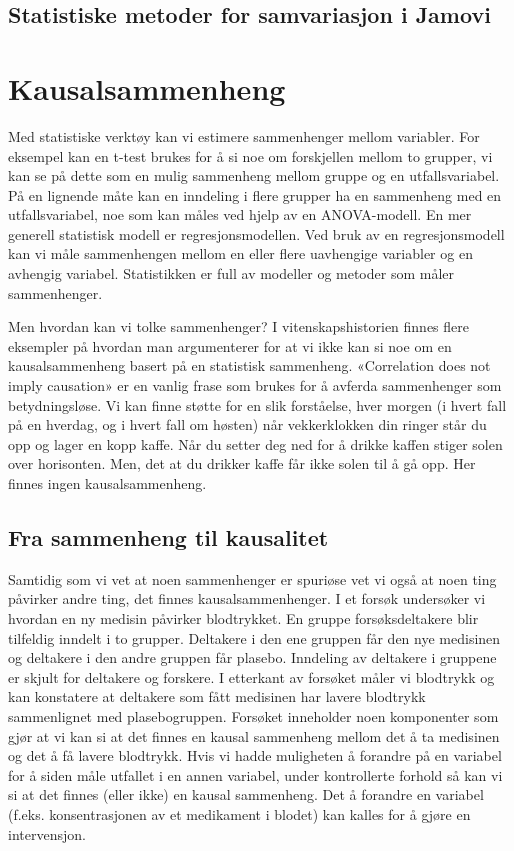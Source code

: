 \documentclass[
  letterpaper,
  DIV=11,
  numbers=noendperiod,
  oneside]{scrreprt}
\begin{document}
\hypertarget{statistiske-metoder-for-samvariasjon-i-jamovi}{%
\chapter{Statistiske metoder for samvariasjon i
Jamovi}\label{statistiske-metoder-for-samvariasjon-i-jamovi}}

\part{Kausalsammenheng}

Med statistiske verktøy kan vi estimere sammenhenger mellom variabler.
For eksempel kan en t-test brukes for å si noe om forskjellen mellom to
grupper, vi kan se på dette som en mulig sammenheng mellom gruppe og en
utfallsvariabel. På en lignende måte kan en inndeling i flere grupper ha
en sammenheng med en utfallsvariabel, noe som kan måles ved hjelp av en
ANOVA-modell. En mer generell statistisk modell er regresjonsmodellen.
Ved bruk av en regresjonsmodell kan vi måle sammenhengen mellom en eller
flere uavhengige variabler og en avhengig variabel. Statistikken er full
av modeller og metoder som måler sammenhenger.

Men hvordan kan vi tolke sammenhenger? I vitenskapshistorien finnes
flere eksempler på hvordan man argumenterer for at vi ikke kan si noe om
en kausalsammenheng basert på en statistisk sammenheng. «Correlation
does not imply causation» er en vanlig frase som brukes for å avferda
sammenhenger som betydningsløse. Vi kan finne støtte for en slik
forståelse, hver morgen (i hvert fall på en hverdag, og i hvert fall om
høsten) når vekkerklokken din ringer står du opp og lager en kopp kaffe.
Når du setter deg ned for å drikke kaffen stiger solen over horisonten.
Men, det at du drikker kaffe får ikke solen til å gå opp. Her finnes
ingen kausalsammenheng.

\hypertarget{fra-sammenheng-til-kausalitet}{%
\chapter{Fra sammenheng til
kausalitet}\label{fra-sammenheng-til-kausalitet}}

Samtidig som vi vet at noen sammenhenger er spuriøse vet vi også at noen
ting påvirker andre ting, det finnes kausalsammenhenger. I et forsøk
undersøker vi hvordan en ny medisin påvirker blodtrykket. En gruppe
forsøksdeltakere blir tilfeldig inndelt i to grupper. Deltakere i den
ene gruppen får den nye medisinen og deltakere i den andre gruppen får
plasebo. Inndeling av deltakere i gruppene er skjult for deltakere og
forskere. I etterkant av forsøket måler vi blodtrykk og kan konstatere
at deltakere som fått medisinen har lavere blodtrykk sammenlignet med
plasebogruppen. Forsøket inneholder noen komponenter som gjør at vi kan
si at det finnes en kausal sammenheng mellom det å ta medisinen og det å
få lavere blodtrykk. Hvis vi hadde muligheten å forandre på en variabel
for å siden måle utfallet i en annen variabel, under kontrollerte
forhold så kan vi si at det finnes (eller ikke) en kausal sammenheng.
Det å forandre en variabel (f.eks. konsentrasjonen av et medikament i
blodet) kan kalles for å gjøre en intervensjon.
\end{document}
